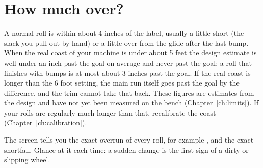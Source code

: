 \section{How much over?}
A normal roll is within about 4 inches of the label, usually a little short
(the slack you pull out by hand) or a little over from the glide after the
last bump. When the real coast of your machine is under
about 5 feet the design estimate is well under an inch past the goal on
average and never past the goal; a roll that finishes with bumps is
at most about 3 inches past the goal. If the real coast is longer than the
6 foot setting, the main run itself goes past the goal by the difference,
and the trim cannot take that back. These figures are estimates from the design and have not yet been
measured on the bench (Chapter~\ref{ch:limits}). If your rolls are regularly
much longer than that, recalibrate the coast (Chapter~\ref{ch:calibration}).

\begin{note}[Tip]
The  screen tells you the exact overrun of every roll, for
example , and  the exact shortfall. Glance at it each time: a sudden change is the
first sign of a dirty or slipping wheel.
\end{note}
